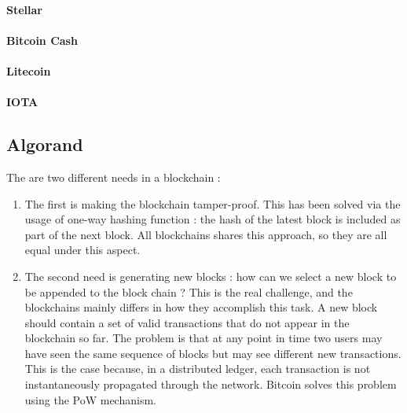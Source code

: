 \paragraph{Stellar}

\paragraph{Bitcoin Cash}

\paragraph{Litecoin}

\paragraph{IOTA}

\subsection{Algorand}
The are two different needs in a blockchain :
\begin{enumerate}
\item The first is making the blockchain tamper-proof. This has been solved via the usage of one-way hashing function : the hash of the latest block is included as part of the next block. All blockchains shares this approach, so they are all equal under this aspect.
\item The second need is generating new blocks : how can we select a new block to be appended to the block chain ? This is the real challenge, and the blockchains mainly differs in how they accomplish this task. A new block should contain a set of valid transactions that do not appear in the blockchain so far. The problem is that at any point in time two users may have seen the same sequence of blocks but may see different new transactions. This is the case because, in a distributed ledger, each transaction is not instantaneously propagated through the network. Bitcoin solves this problem using the PoW mechanism.
\end{enumerate}
